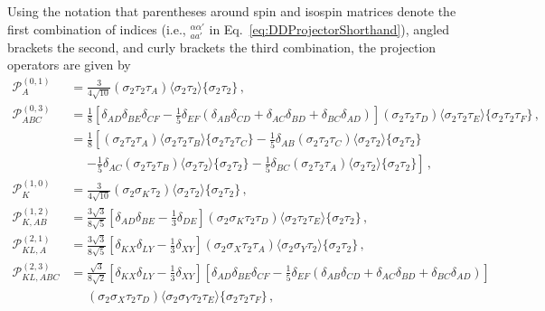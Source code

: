 \documentclass[nofootinbib, preprint, aps, prc, superscriptaddress,11pt]{revtex4-1}
\newcommand{\1}{\mathbbm{1}}
\begin{document}
Using the notation that parentheses around spin and isospin matrices denote the first combination of indices (i.e., ${}_{aa'}^{\alpha\alpha'}$ in Eq.~\eqref{eq:DDProjectorShorthand}), angled brackets the second, and curly brackets the third combination, the projection operators are given by 
\begin{align}
\mathscr{P}^{(0,1)}_A & = 
        \frac{3}{4\sqrt{10}}(\sigma_2\tau_2\tau_A)\langle\sigma_2\tau_2\rangle \{\sigma_2\tau_2 \} \, , \label{eq:P1S0I1} \\
\mathscr{P}^{(0,3)}_{ABC} & = 
        \frac{1}{8} \left[ \delta_{AD}\delta_{BE}\delta_{CF} - \frac{1}{5}\delta_{EF}(\delta_{AB}\delta_{CD}+\delta_{AC}\delta_{BD}+\delta_{BC}\delta_{AD}) \right] 
        (\sigma_2\tau_2\tau_D)\langle\sigma_2\tau_2\tau_E\rangle \{\sigma_2\tau_2\tau_F \} \, , \nonumber \\
    &= 
        \frac{1}{8} \left[ (\sigma_2\tau_2\tau_A)\langle\sigma_2\tau_2\tau_B\rangle \{\sigma_2\tau_2\tau_C \} 
        -\frac{1}{5} \delta_{AB}(\sigma_2\tau_2\tau_C)\langle\sigma_2\tau_2\rangle \{\sigma_2\tau_2 \} \right. \\
    &\mathrel{\phantom{=}} \left.   -\frac{1}{5}\delta_{AC}(\sigma_2\tau_2\tau_B)\langle\sigma_2\tau_2\rangle \{\sigma_2\tau_2 \} 
        -\frac{1}{5}\delta_{BC}(\sigma_2\tau_2\tau_A)\langle\sigma_2\tau_2\rangle \{\sigma_2\tau_2 \}\right]\, , \nonumber \\
\mathscr{P}^{(1,0)}_K & = 
        \frac{3}{4\sqrt{10}} (\sigma_2\sigma_K\tau_2)\langle\sigma_2\tau_2\rangle \{\sigma_2\tau_2 \} \, , \\
\mathscr{P}^{(1,2)}_{K,AB} & = 
        \frac{3\sqrt{3}}{8\sqrt{5}} \left[ \delta_{AD}\delta_{BE} - \frac{1}{3}\delta_{DE} \right]
        (\sigma_2\sigma_K\tau_2\tau_D)\langle\sigma_2\tau_2\tau_E\rangle \{\sigma_2\tau_2 \} \, , \\
\mathscr{P}^{(2,1)}_{KL,A} & =  
        \frac{3\sqrt{3}}{8\sqrt{5}} \left[ \delta_{KX}\delta_{LY} - \frac{1}{3}\delta_{XY} \right](\sigma_2\sigma_X\tau_2\tau_A)\langle\sigma_2\sigma_Y\tau_2\rangle \{\sigma_2\tau_2 \} \, ,\\
\mathscr{P}^{(2,3)}_{KL,ABC} & =  
        \frac{\sqrt{3}}{8\sqrt{2}} \left[ \delta_{KX}\delta_{LY} - \frac{1}{3}\delta_{XY} \right]
        \left[ \delta_{AD}\delta_{BE}\delta_{CF} - \frac{1}{5}\delta_{EF}(\delta_{AB}\delta_{CD}+\delta_{AC}\delta_{BD}+\delta_{BC}\delta_{AD}) \right] \nonumber\\
    &\mathrel{\phantom{=}}(\sigma_2\sigma_X\tau_2\tau_D)\langle\sigma_2\sigma_Y\tau_2\tau_E\rangle \{\sigma_2\tau_2\tau_F \} \, ,\\

\end{align}
\end{document}
